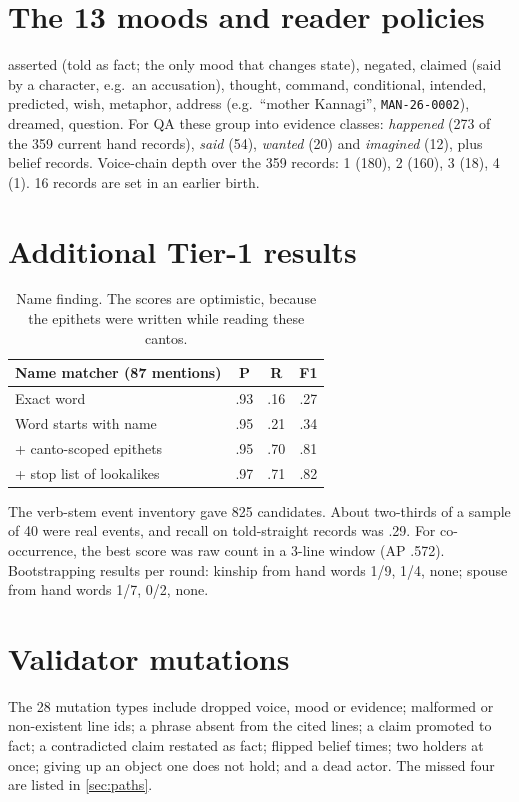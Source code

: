 \documentclass[11pt]{article}
\newcommand{\lid}[1]{\texttt{\small #1}}
\newcommand{\mood}[1]{\textsf{\small #1}}
\begin{document}
\label{po_refstart}


\appendix
\section{The 13 moods and reader policies}
\label{app:moods}
\mood{asserted} (told as fact; the only mood that changes state), \mood{negated}, \mood{claimed} (said by a character, e.g.\ an accusation), \mood{thought}, \mood{command}, \mood{conditional}, \mood{intended}, \mood{predicted}, \mood{wish}, \mood{metaphor}, \mood{address} (e.g.\ ``mother Kannagi'', \lid{MAN-26-0002}), \mood{dreamed}, \mood{question}. For QA these group into evidence classes: \emph{happened} (273 of the 359 current hand records), \emph{said} (54), \emph{wanted} (20) and \emph{imagined} (12), plus belief records. Voice-chain depth over the 359 records: 1 (180), 2 (160), 3 (18), 4 (1). 16 records are set in an earlier birth.

\section{Additional Tier-1 results}
\label{app:tier1}
\begin{table}[h]
\centering\small
\begin{tabular}{@{}lccc@{}}
\toprule
Name matcher (87 mentions) & P & R & F1 \\
\midrule
Exact word & .93 & .16 & .27 \\
Word starts with name & .95 & .21 & .34 \\
+ canto-scoped epithets & .95 & .70 & .81 \\
+ stop list of lookalikes & .97 & .71 & .82 \\
\bottomrule
\end{tabular}
\caption{Name finding. The scores are optimistic, because the epithets were written while reading these cantos.}
\end{table}
The verb-stem event inventory gave 825 candidates. About two-thirds of a sample of 40 were real events, and recall on told-straight records was .29. For co-occurrence, the best score was raw count in a 3-line window (AP .572). Bootstrapping results per round: kinship from hand words 1/9, 1/4, none; spouse from hand words 1/7, 0/2, none.

\section{Validator mutations}
\label{app:mut}
The 28 mutation types include dropped voice, mood or evidence; malformed or non-existent line ids; a phrase absent from the cited lines; a claim promoted to fact; a contradicted claim restated as fact; flipped belief times; two holders at once; giving up an object one does not hold; and a dead actor. The missed four are listed in \cref{sec:paths}.
\end{document}
